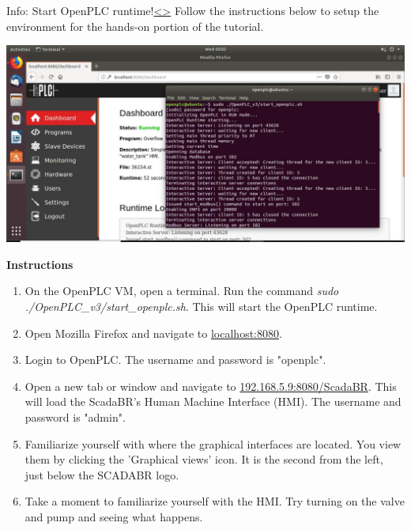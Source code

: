 \documentclass[12pt]{extarticle}
\newenvironment{instructionblock}{\Large\bgroup}{\egroup}
\newcommand{\ben}{\begin{enumerate}}
\newcommand{\een}{\end{enumerate}}
\newcounter{next}
\newcounter{prev}
\begin{document}
\pagebreak
{}
\begin{slide}{Info: Start OpenPLC runtime!}{\hyperref[slide \theprev]{\textless}\hyperref[slide \thenext]{\textgreater}}
	\begin{instructionblock}
Follow the instructions below to setup the environment for the hands-on portion of the tutorial.
\begin{center}
	\includegraphics[scale=0.36]{Images/OpenPLCRuntime01.JPG}
\end{center}
	\end{instructionblock}
\end{slide}
\vfill
\noindent
\textbf{Instructions}\\
	\ben
\item On the OpenPLC VM, open a terminal. Run the command \textit{sudo ./OpenPLC\_v3/start\_openplc.sh}. This will start the OpenPLC runtime.
\item Open Mozilla Firefox and navigate to \url{localhost:8080}. 
\item Login to OpenPLC. The username and password is "openplc".
\item Open a new tab or window and navigate to \url{192.168.5.9:8080/ScadaBR}. This will load the ScadaBR's Human Machine Interface (HMI). The username and password is "admin".
\item Familiarize yourself with where the graphical interfaces are located. You view them by clicking the 'Graphical views' icon. It is the second from the left, just below the SCADABR logo.
\item Take a moment to familiarize yourself with the HMI. Try turning on the valve and pump and seeing what happens.
\een
\end{document}
